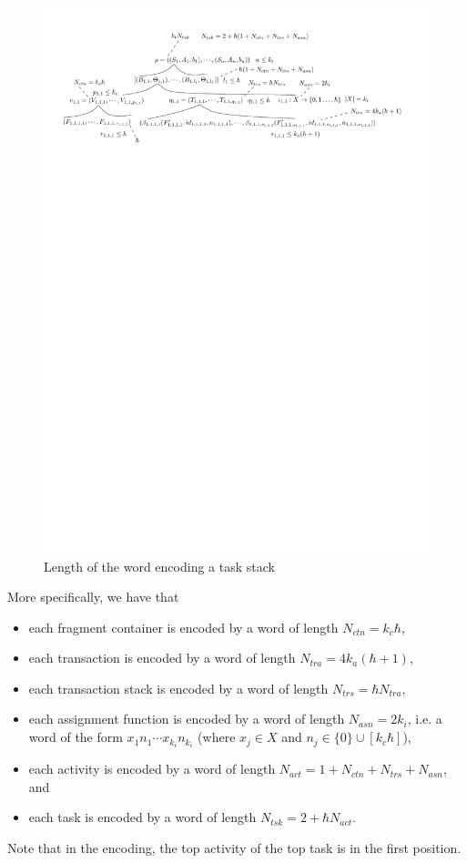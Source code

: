 \begin{figure}[t]
\centering
\includegraphics[scale = 0.7]{conf-enc-length.pdf}
\caption{Length of the word encoding a task stack}
\label{fig-conf-enc}
\end{figure}

More specifically, we have that 
\begin{itemize}
\item each fragment container is encoded by a word of length $N_{ctn} =  k_c \hbar$, 
%
\item each transaction is encoded by a word of length $N_{tra} = 4k_a(\hbar+1)$, 
%
\item each transaction stack is encoded by a word of length $N_{trs} = \hbar N_{tra}$, 
%
\item each assignment function is encoded by a word of length $N_{asn} = 2k_i $, i.e. a word of the form $x_1 n_1 \cdots x_{k_i} n_{k_i}$ (where $x_j \in X$ and $n_j \in \{0\} \cup [k_c\hbar]$), 
%
\item each activity is encoded by a word of length $N_{act} = 1+ N_{ctn} + N_{trs}+N_{asn}$, and
\item each task is encoded by a word of length $N_{tsk} =2+ \hbar N_{act}$.
\end{itemize}
Note that in the encoding, the top activity of the top task is in the first position.

